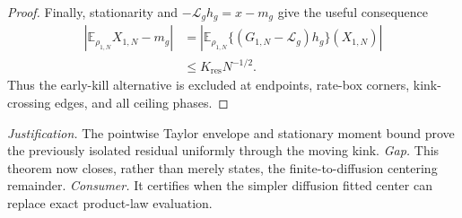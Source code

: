 \documentclass{article}
\begin{document}
\begin{proof}
Finally, stationarity and \(-\mathcal L_gh_g=x-m_g\) give the useful consequence
\[
 \begin{split}
 \left|\mathbb E_{\rho_{1,N}}X_{1,N}-m_g\right|
 &=\left|\mathbb E_{\rho_{1,N}}
   \{(G_{1,N}-\mathcal L_g)h_g\}(X_{1,N})\right|\\
 &\leq K_{\mathrm{res}}N^{-1/2}.                              \tag{18}
 \end{split}
\]
Thus the early-kill alternative is excluded at endpoints, rate-box corners, kink-crossing edges, and all ceiling phases.
\end{proof}
\par\smallskip\noindent \textit{Justification.} The pointwise Taylor envelope and stationary moment bound prove the previously isolated residual uniformly through the moving kink. \textit{Gap.} This theorem now closes, rather than merely states, the finite-to-diffusion centering remainder. \textit{Consumer.} It certifies when the simpler diffusion fitted center can replace exact product-law evaluation.
\end{document}
